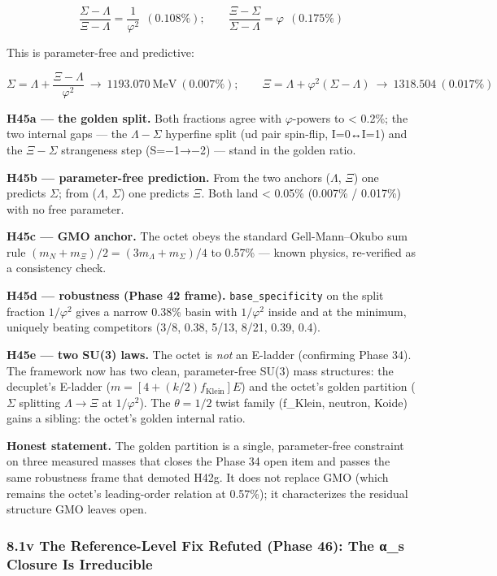 \documentclass[
]{article}
\begin{document}
\[\frac{\Sigma-\Lambda}{\Xi-\Lambda} = \frac{1}{\varphi^2}\ \ (0.108\%); \qquad \frac{\Xi-\Sigma}{\Sigma-\Lambda} = \varphi\ \ (0.175\%)\]

This is parameter-free and predictive:

\[\Sigma = \Lambda + \frac{\Xi-\Lambda}{\varphi^2}\ \to\ 1193.070\ \text{MeV}\ (0.007\%); \qquad \Xi = \Lambda + \varphi^2(\Sigma-\Lambda)\ \to\ 1318.504\ (0.017\%)\]

\textbf{H45a --- the golden split.} Both fractions agree with
\(\varphi\)-powers to \textless{} 0.2\%; the two internal gaps --- the
\(\Lambda{-}\Sigma\) hyperfine split (ud pair spin-flip, I=0↔I=1) and
the \(\Xi{-}\Sigma\) strangeness step (S=−1→−2) --- stand in the golden
ratio.

\textbf{H45b --- parameter-free prediction.} From the two anchors
(\(\Lambda\), \(\Xi\)) one predicts \(\Sigma\); from (\(\Lambda\),
\(\Sigma\)) one predicts \(\Xi\). Both land \textless{} 0.05\% (0.007\%
/ 0.017\%) with no free parameter.

\textbf{H45c --- GMO anchor.} The octet obeys the standard
Gell-Mann--Okubo sum rule
\((m_N+m_{\Xi})/2 = (3m_{\Lambda}+m_{\Sigma})/4\) to 0.57\% --- known
physics, re-verified as a consistency check.

\textbf{H45d --- robustness (Phase 42 frame).}
\texttt{base\_specificity} on the split fraction \(1/\varphi^2\) gives a
narrow 0.38\% basin with \(1/\varphi^2\) inside and at the minimum,
uniquely beating competitors (3/8, 0.38, 5/13, 8/21, 0.39, 0.4).

\textbf{H45e --- two SU(3) laws.} The octet is \emph{not} an E-ladder
(confirming Phase 34). The framework now has two clean, parameter-free
SU(3) mass structures: the decuplet's E-ladder
(\(m = [4 + (k/2)f_{\text{Klein}}]E\)) and the octet's golden partition
(\(\Sigma\) splitting \(\Lambda\to\Xi\) at \(1/\varphi^2\)). The
\(\theta = 1/2\) twist family (f\_Klein, neutron, Koide) gains a
sibling: the octet's golden internal ratio.

\textbf{Honest statement.} The golden partition is a single,
parameter-free constraint on three measured masses that closes the Phase
34 open item and passes the same robustness frame that demoted H42g. It
does not replace GMO (which remains the octet's leading-order relation
at 0.57\%); it characterizes the residual structure GMO leaves open.

\subsubsection{8.1v The Reference-Level Fix Refuted (Phase 46): The α\_s
Closure Is
Irreducible}\label{v-the-reference-level-fix-refuted-phase-46-the-ux3b1_s-closure-is-irreducible}
\end{document}
